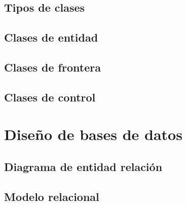 \subsection{Tipos de clases}

\subsection{Clases de entidad}

\subsection{Clases de frontera}

\subsection{Clases de control}

\section{Diseño de bases de datos}

\subsection{Diagrama de entidad relación}

\subsection{Modelo relacional}
